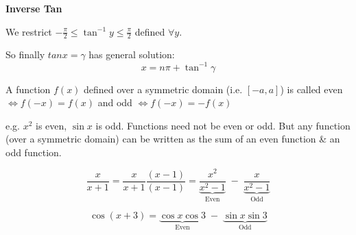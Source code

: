 \documentclass[twoside]{scrartcl}
\begin{document}
\textbf{Inverse Tan}\\
\begin{minipage}{7cm}


We restrict $-\frac{\pi}{2} \leq \tan^{-1}y \leq \frac{\pi}{2}$ defined $\forall y$.

So finally $tanx = \gamma$ has general solution: 
\[\boxed{x = n\pi + \tan^{-1}\gamma}\]
\end{minipage}
\begin{minipage}{7cm}
  \begin{center}
\end{center}
\end{minipage}

\pagebreak


\vspace*{5pt}
\begin{definition} 
A function $f(x)$ defined over a symmetric domain (i.e. $[-a,a]$) is called even $\iff f(-x) = f(x)$ and odd $\iff f(-x) = -f(x)$
\end{definition}

e.g. $x^2$ is even, $\sin x$ is odd. Functions need not be even or odd. But any function (over a symmetric domain) can be written as the sum of an even function \& an odd function. \\

\begin{example}
\[\dfrac{x}{x+1} = \dfrac{x}{x+1} \dfrac{(x-1)}{(x-1)} = \underbrace{\dfrac{x^2}{x^2-1}}_{\text{Even}} \;-\; \underbrace{\dfrac{x}{x^2-1}}_{\text{Odd}}\]
\end{example}

\begin{example}
\[\cos(x+3) = \underbrace{\cos x \cos 3}_{\text{Even}} \; - \; \underbrace{\sin x \sin 3}_{\text{Odd}}\]
\end{example}
\end{document}
